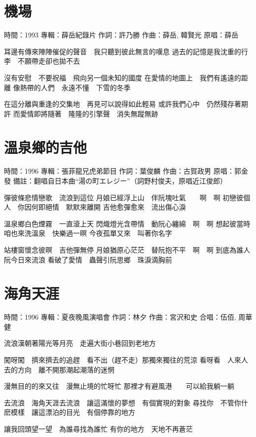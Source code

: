 \documentclass[UTF8,a4paper,oneside,twocolumn,12pt]{ctexbook}
\newcommand{\infopair}[2]{\textbullet #1：#2}
\newcommand{\zc}[1][伍佰]{\infopair{作詞}{#1}}
\newcommand{\zq}[1][伍佰]{\infopair{作曲}{#1}}
\newcommand{\zj}[1]{\infopair{專輯}{#1}}
\newcommand{\yc}[1]{\infopair{原唱}{#1}}
\newcommand{\sj}[1]{\infopair{時間}{#1}}
\newcommand{\bz}[1]{\infopair{備註}{#1}}
\newenvironment{info}{\begin{flushleft}\kaishu
	}
	{\end{flushleft}\normalsize\yahei\par}
\newenvironment{lyric}{
	}
{}
\begin{document}
\section{機場}
\begin{info}
	\sj{1993}
	\zj{薛岳紀錄片}
	\zc[許乃勝]
	\zq[薛岳, 韓賢光]
	\yc{薛岳}
\end{info}
\begin{lyric}
	耳邊有傳來陣陣催促的聲音　我只聽到彼此無言的嘆息
	過去的記憶是我沈重的行李　不願帶走卻也拋不去

	沒有安慰　不要祝福　飛向另一個未知的國度
	在愛情的地圖上　我們有遙遠的距離
	像熱帶的人們　永遠不懂　下雪的冬季

	在這分離與重逢的交集地　再見可以說得如此輕易
	或許我們心中　仍然殘存著期許
	而愛情即將隨著　隆隆的引擎聲　消失無蹤無跡
\end{lyric}

\section{溫泉鄉的吉他}%
\begin{info}
	\sj{1996}
	\zj{張菲龍兄虎弟節目}
	\zc[葉俊麟]
	\zq[古賀政男]
	\yc{郭金發}
	\bz{翻唱自日本曲“湯の町エレジー”（詞野村俊夫，原唱近江俊郎）}
\end{info}
\begin{lyric}
	彈彼條悲情戀歌　流浪到這位
	月娘已經浮上山　伴阮塊吐氣　　啊　啊
	初戀彼個人　你因何即絕情　默默來離開
	吉他愈彈愈來　流出傷心淚

	溫泉鄉白色煙霧　一直滾上天
	閃熾燈光含帶情　動阮心纏綿　啊　啊
	想起彼當時　咱也來洗溫泉　快樂過一暝
	今夜孤單又來　叫著你名字

	站樓窗懷念彼暝　吉他彈無停
	月娘猶原心茫茫　替阮抱不平　啊　啊
	到底為誰人　阮今日來流浪
	看破了愛情　蟲聲引阮思鄉　珠淚滴胸前
\end{lyric}

\section{海角天涯}
\begin{info}
	\sj{1996}
	\zj{夏夜晚風演唱會}
	\zc[林夕]
	\zq[宮沢和史]
	\infopair{合唱}{伍佰, 周華健}
\end{info}
\begin{lyric}
	流浪漢朝著陽光等月亮　走遍大街小巷回到老地方

	闖呀闖　擠來擠去的追趕　看不出（趕不走）那獨來獨往的荒涼
	看呀看　人來人去的方向　離不開那潮起潮落的迷惘

	漫無目的的來又往　漫無止境的忙呀忙
	那裡才有避風港　　可以給我躺一躺

	去流浪　海角天涯去流浪　讓這滿懷的夢想　有個實現的對象
	尋找你　不管你什麽模樣　讓這漂泊的目光　有個停靠的地方

	讓我回頭望一望　為誰尋找為誰忙
	有你的地方　天地不再蒼茫
\end{lyric}
\end{document}
